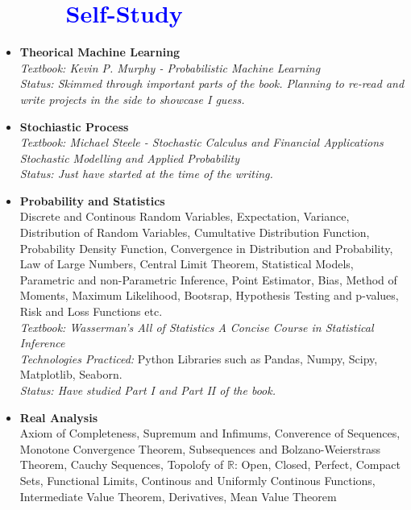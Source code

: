 \documentclass[12pt]{article}
\begin{document}
\section*{\textcolor{blue}{\ \ \ \ \  Self-Study}}
\begin{itemize}
    \item[] \textbf{Theorical Machine Learning}
        \\
        \textit{Textbook: Kevin P. Murphy - Probabilistic Machine Learning}
        \\
        \textit{Status: Skimmed through important parts of the book. Planning to re-read and write projects in the side to showcase I guess.}
    \item[] \textbf{Stochiastic Process}
        \\
        \textit{Textbook: Michael Steele - Stochastic Calculus and Financial Applications Stochastic Modelling and Applied Probability}
        \\
        \textit{Status: Just have started at the time of the writing.}
    \item[] \textbf{Probability and Statistics}
        \\
        Discrete and Continous Random Variables, Expectation, Variance, Distribution of Random Variables, Cumultative Distribution
        Function, Probability Density Function, Convergence in Distribution and Probability, Law of Large Numbers, Central Limit Theorem,
        Statistical Models, Parametric and non-Parametric Inference, Point Estimator, Bias, Method of Moments, Maximum Likelihood,
        Bootsrap, Hypothesis Testing and p-values, Risk and Loss Functions etc.
        \\
        \textit{Textbook: Wasserman's All of Statistics  A Concise Course in Statistical Inference}
        \\
        \textit{Technologies Practiced:} Python Libraries such as Pandas, Numpy, Scipy, Matplotlib, Seaborn.
        \\
        \textit{Status: Have studied Part I and Part II of the book.}
    \item[] \textbf{Real Analysis}
        \\
        Axiom of Completeness, Supremum and Infimums, Converence of Sequences, Monotone Convergence Theorem, Subsequences and
        Bolzano-Weierstrass Theorem, Cauchy Sequences, Topolofy of $\mathbb{R}$: Open, Closed, Perfect, Compact Sets, Functional Limits,
        Continous and Uniformly Continous Functions, Intermediate Value Theorem, Derivatives, Mean Value Theorem

\end{itemize}
\end{document}
